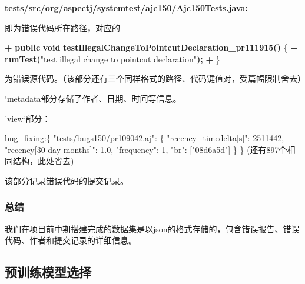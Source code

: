 \documentclass[
]{article}
\newenvironment{Shaded}{}{}
\newcommand{\DataTypeTok}[1]{\textcolor[rgb]{0.56,0.13,0.00}{#1}}
\newcommand{\ErrorTok}[1]{\textcolor[rgb]{1.00,0.00,0.00}{\textbf{#1}}}
\newcommand{\FunctionTok}[1]{\textcolor[rgb]{0.02,0.16,0.49}{#1}}
\newcommand{\NormalTok}[1]{#1}
\begin{document}
\begin{Shaded}
  \begin{Highlighting}[]
    \ErrorTok{tests/src/org/aspectj/systemtest/ajc150/Ajc150Tests.java:}
  \end{Highlighting}
\end{Shaded}

即为错误代码所在路径，对应的

\begin{Shaded}
  \begin{Highlighting}[]
    \ErrorTok{+}  \ErrorTok{public} \ErrorTok{void} \ErrorTok{testIllegalChangeToPointcutDeclaration\_pr111915()} \FunctionTok{\{}
    \ErrorTok{+}	\ErrorTok{runTest(}\DataTypeTok{"test illegal change to pointcut declaration"}\ErrorTok{);}
    \ErrorTok{+}  \FunctionTok{\}}
  \end{Highlighting}
\end{Shaded}

为错误源代码。（该部分还有三个同样格式的路径、代码键值对，受篇幅限制舍去）

`metadata\textquotesingle 部分存储了作者、日期、时间等信息。

'view`部分：

\begin{Shaded}
  \begin{Highlighting}[]
    \NormalTok{\textquotesingle{}bug\_fixing\textquotesingle{}:\{}
    \NormalTok{"tests/bugs150/pr109042.aj": \{}
    \NormalTok{  "recency\_timedelta[s]": 2511442,}
    \NormalTok{  "recency[30{-}day months]": 1.0,}
    \NormalTok{  "frequency": 1,}
    \NormalTok{  "br": ["08d6a5d"]}
    \NormalTok{\}}
    \NormalTok{\}}
    \NormalTok{(还有897个相同结构，此处省去)}
  \end{Highlighting}
\end{Shaded}

该部分记录错误代码的提交记录。

\subsubsection{总结}\label{ux603bux7ed3}

我们在项目前中期搭建完成的数据集是以json的格式存储的，包含错误报告、错误代码、作者和提交记录的详细信息。

\subsection{预训练模型选择}\label{ux9884ux8badux7ec3ux6a21ux578bux9009ux62e9}
\end{document}
